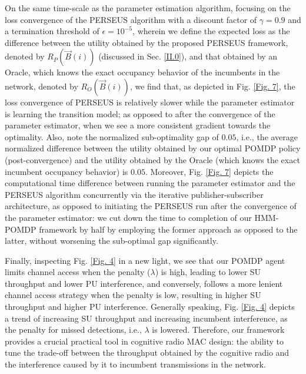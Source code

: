 \documentclass[12pt, draftcls, onecolumn]{IEEEtran}
\begin{document}
On the same time-scale as the parameter estimation algorithm, focusing on the loss convergence of the PERSEUS algorithm with a discount factor of $\gamma{=}0.9$ and a termination threshold of $\epsilon{=}10^{-5}$, wherein we define the expected loss as the difference between the utility obtained by the proposed PERSEUS framework, denoted by $R_{P}(\vec{B}(i))$ (discussed in Sec. \ref{II.0}), and that obtained by an Oracle, which knows the exact occupancy behavior of the incumbents in the network, denoted by $R_{O}(\vec{B}(i))$, we find that, as depicted in Fig. \ref{Fig. 7}, the loss convergence of PERSEUS is relatively slower while the parameter estimator is learning the transition model; as opposed to after the convergence of the parameter estimator, when we see a more consistent gradient towards the optimality. Also, note the normalized sub-optimality gap of $0.05$, i.e., the average normalized difference between the utility obtained by our optimal POMDP policy (post-convergence) and the utility obtained by the Oracle (which knows the exact incumbent occupancy behavior) is $0.05$. Moreover, Fig. \ref{Fig. 7} depicts the computational time difference between running the parameter estimator and the PERSEUS algorithm concurrently via the iterative publisher-subscriber architecture, as opposed to initiating the PERSEUS run after the convergence of the parameter estimator: we cut down the time to completion of our HMM-POMDP framework by half by employing the former approach as opposed to the latter, without worsening the sub-optimal gap significantly.

Finally, inspecting Fig. \ref{Fig. 4} in a new light, we see that our POMDP agent limits channel access when the penalty ($\lambda$) is high, leading to lower SU throughput and lower PU interference, and conversely, follows a more lenient channel access strategy when the penalty is low, resulting in higher SU throughput and higher PU interference. Generally speaking, Fig. \ref{Fig. 4} depicts a trend of increasing SU throughput and increasing incumbent interference, as the penalty for missed detections, i.e., $\lambda$ is lowered. Therefore, our framework provides a crucial practical tool in cognitive radio MAC design: the ability to tune the trade-off between the throughput obtained by the cognitive radio and the interference caused by it to incumbent transmissions in the network.
\end{document}
